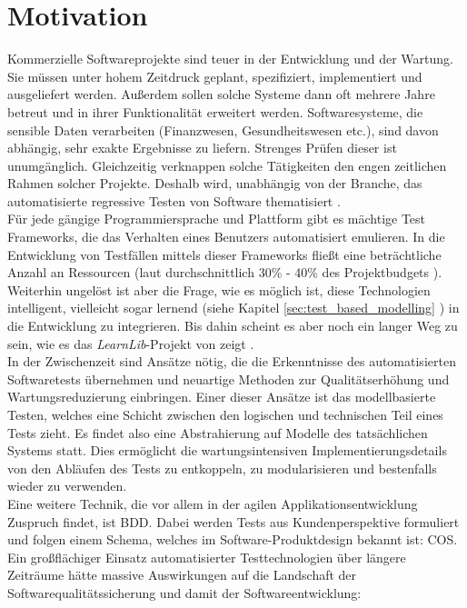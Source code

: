 \section{Motivation}
Kommerzielle Softwareprojekte sind teuer in der Entwicklung und der Wartung. Sie müssen unter hohem Zeitdruck geplant, spezifiziert, implementiert und ausgeliefert werden. Außerdem sollen solche Systeme dann oft mehrere Jahre betreut und in ihrer Funktionalität erweitert werden. Softwaresysteme, die sensible Daten verarbeiten (Finanzwesen, Gesundheitswesen etc.), sind davon abhängig, sehr exakte Ergebnisse zu liefern. Strenges Prüfen dieser ist unumgänglich. Gleichzeitig verknappen solche Tätigkeiten den engen zeitlichen Rahmen solcher Projekte. Deshalb wird, unabhängig von der Branche, das automatisierte regressive Testen von Software thematisiert \cite{graham_experiences_2012}.\\
Für jede gängige Programmiersprache und Plattform gibt es mächtige Test \Glspl{Framework}, die das Verhalten eines Benutzers automatisiert emulieren. In die Entwicklung von Testfällen mittels dieser \Glspl{Framework} fließt eine beträchtliche Anzahl an Ressourcen (laut \citeauthor{pol_management_2002} durchschnittlich 30\% - 40\% des Projektbudgets \cite{pol_management_2002}). Weiterhin ungelöst ist aber die Frage, wie es möglich ist, diese Technologien intelligent, vielleicht sogar lernend (siehe Kapitel \ref{sec:test_based_modelling} ) in die Entwicklung zu integrieren. Bis dahin scheint es aber noch ein langer Weg zu sein, wie es das \textit{LearnLib}-Projekt von \citeauthor{steffen_introduction_2011} zeigt \cite{steffen_introduction_2011}.\\

In der Zwischenzeit sind Ansätze nötig, die die Erkenntnisse des automatisierten Softwaretests übernehmen und neuartige Methoden zur Qualitätserhöhung und Wartungsreduzierung einbringen. Einer dieser Ansätze ist das modellbasierte Testen, welches eine Schicht zwischen den logischen und technischen Teil eines Tests zieht. Es findet also eine Abstrahierung auf Modelle des tatsächlichen Systems statt. Dies ermöglicht die wartungsintensiven Implementierungsdetails von den Abläufen des Tests zu entkoppeln, zu modularisieren und bestenfalls wieder zu verwenden.\\
Eine weitere Technik, die vor allem in der agilen Applikationsentwicklung Zuspruch findet, ist \Gls{BDD}. Dabei werden Tests aus Kundenperspektive formuliert und folgen einem Schema, welches im Software-Produktdesign bekannt ist: \Gls{COS}.
Ein großflächiger Einsatz automatisierter Testtechnologien über längere Zeiträume hätte massive Auswirkungen auf die Landschaft der Softwarequalitätssicherung und damit der Softwareentwicklung:

